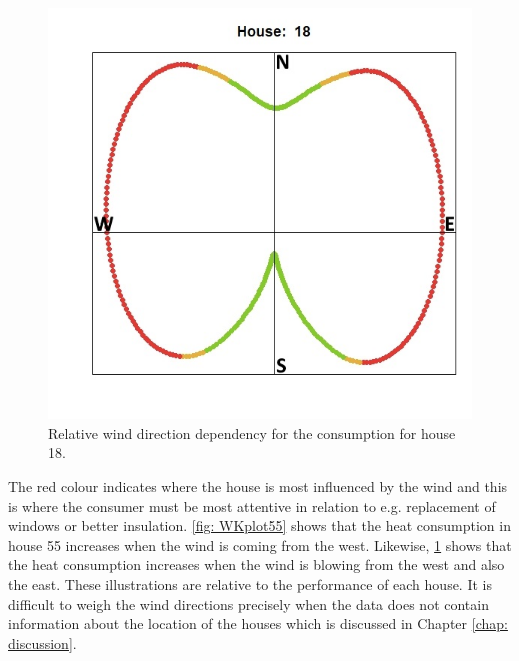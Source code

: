 \begin{figure}
    \centering
    \includegraphics[scale=0.65]{../../../figures/WKplot18.jpeg}
    \caption{Relative wind direction dependency for the consumption for house 18.}
    \label{fig: WKplot18}
\end{figure}
The red colour indicates where the house is most influenced by the wind and this is where the consumer must be most attentive in relation to e.g. replacement of windows or better insulation. \cref{fig: WKplot55} shows that the heat consumption in house 55 increases when the wind is coming from the west. Likewise, \cref{fig: WKplot18} shows that the heat consumption increases when the wind is blowing from the west and also the east. These illustrations are relative to the performance of each house. It is difficult to weigh the wind directions precisely when the data does not contain information about the location of the houses which is discussed in Chapter \ref{chap: discussion}. 

